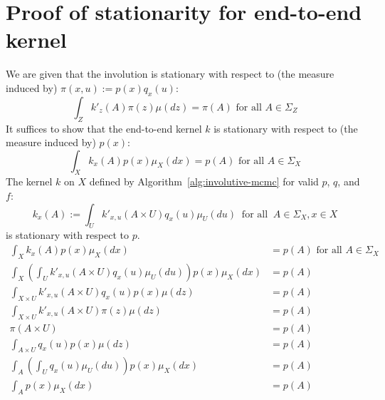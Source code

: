 \documentclass[twoside]{article}
\begin{document}
\section{Proof of stationarity for end-to-end kernel}
We are given that the involution is stationary with respect to (the measure induced by) $\pi(x, u) := p(x) q_x(u)$:
\[
\int_Z k'_z(A) \pi(z) \mu(dz) = \pi(A) \mbox{ for all } A \in \Sigma_Z
\]
It suffices to show that the end-to-end kernel $k$ is stationary with respect to (the measure induced by) $p(x)$:
\[
\int_X k_x(A) p(x) \mu_X(dx) = p(A) \mbox{ for all } A \in \Sigma_X
\]
The kernel $k$ on $X$ defined by Algorithm~\ref{alg:involutive-mcmc} for valid $p$, $q$, and $f$:
\[
k_x(A) := \int_U k'_{x,u}(A \times U) q_x(u) \mu_U(du) \;\; \mbox{for all} \;\; A \in \Sigma_X, x \in X
\]
is stationary with respect to $p$.
\begin{align*}
    \int_X k_x(A) p(x) \mu_X(dx) &= p(A) \mbox{ for all } A \in \Sigma_X\\
    \int_X \left( \int_U k'_{x,u}(A \times U) q_x(u) \mu_U(du) \right) p(x) \mu_X(dx) &= p(A)\\
    \int_{X \times U} k'_{x,u}(A \times U) q_x(u) p(x) \mu(dz) &= p(A)\\
    \int_{X \times U} k'_{x,u}(A \times U) \pi(z) \mu(dz) &= p(A)\\
    \pi(A \times U) &= p(A)\\
    \int_{A \times U} q_x(u) p(x) \mu(dz) &= p(A)\\
    \int_A \left( \int_U q_x(u) \mu_U(du) \right) p(x) \mu_X(dx) &= p(A)\\
    \int_A p(x) \mu_X(dx) &= p(A)
\end{align*}
\end{document}
